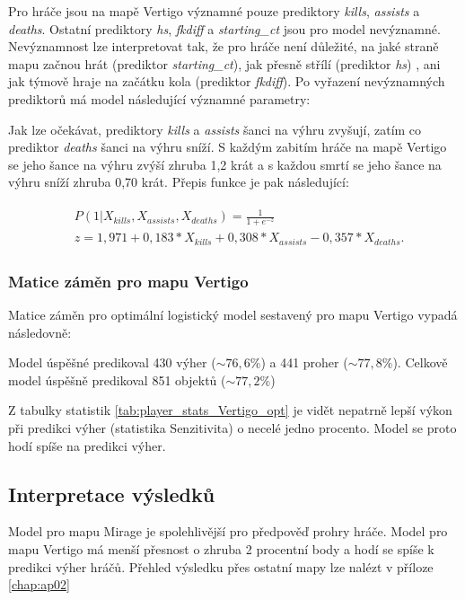 

Pro hráče jsou na mapě Vertigo významné pouze prediktory \textit{kills}, \textit{assists} a \textit{deaths}. Ostatní prediktory \textit{hs}, \textit{fkdiff} a \textit{starting\_ct}
jsou pro model nevýznamné. Nevýznamnost lze interpretovat tak, že pro hráče není důležité, na jaké straně mapu začnou hrát (prediktor  \textit{starting\_ct}), jak přesně
střílí (prediktor \textit{hs})
{\color{red}
, ani jak týmově hraje na začátku kola (prediktor \textit{fkdiff}).
}
Po vyřazení nevýznamných prediktorů má model následující významné parametry:



{\color{red}
Jak lze očekávat, prediktory \textit{kills} a \textit{assists} šanci na výhru zvyšují, zatím co prediktor \textit{deaths} šanci na výhru sníží. S každým zabitím hráče
na mapě Vertigo se jeho šance na výhru zvýší zhruba 1,2 krát a s každou smrtí se jeho šance na výhru sníží zhruba 0,70 krát.
}
Přepis funkce je pak následující:

\begin{align}
    \begin{split}
        &P(1 | X_{kills}, X_{assists}, X_{deaths}) = \frac{1}{1 + e^{-z}} \\
        &z = 1,971 + 0,183*X_{kills} + 0,308*X_{assists} - 0,357*X_{deaths}.
    \end{split}
\end{align}

\subsubsection{Matice záměn pro mapu Vertigo}
Matice záměn pro 
{\color{red}
optimální
}
logistický model sestavený pro mapu Vertigo
{\color{red}
vypadá následovně:
}



Model úspěšné predikoval 430 výher
{\color{red}
($\sim 76,6\%$)
}
a 441 proher 
{\color{red}
($\sim 77,8\%$). Celkově model úspěšně predikoval 851 objektů ($\sim 77,2\%$)
}



Z tabulky statistik \ref{tab:player_stats_Vertigo_opt} je vidět nepatrně lepší výkon při predikci výher (statistika Senzitivita) o necelé jedno procento.
Model se proto hodí spíše na predikci výher.

\subsection{Interpretace výsledků}
Model pro mapu Mirage je spolehlivější pro předpověď prohry hráče. Model pro mapu Vertigo má menší přesnost o zhruba 
2 procentní body a hodí se spíše k predikci výher hráčů.
{\color{red}
Přehled výsledku přes ostatní mapy lze nalézt v příloze \ref{chap:ap02}
}

